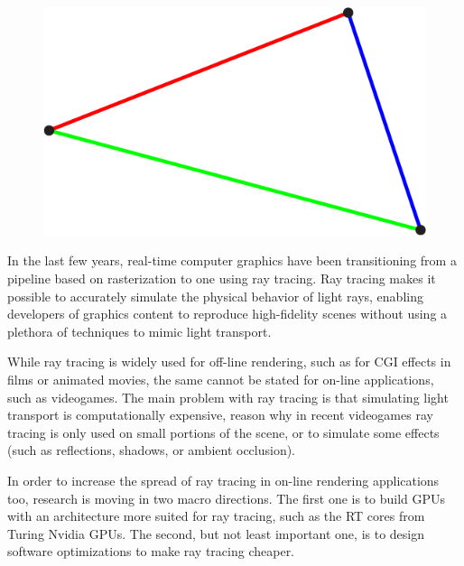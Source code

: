\documentclass{PoliMi_MasterThesis}
\newcommand*\triangleLogo{
	\clearpage
	\thispagestyle{empty}
	\newpage
	\begin{figure}
		\centering
		\includegraphics[width=\textwidth]{Images/triangle_logo_thin.png} 
	\end{figure}
}
\begin{document}


\pagestyle{empty} %
\frontmatter %



\startpreamble
\triangleLogo
\setcounter{page}{1} %

\makeatletter
\let\savedchap\@makechapterhead
\def\@makechapterhead{\savedchap}
\let\@makechapterhead\savedchap
\makeatletter


In the last few years, real-time computer graphics have been transitioning from a pipeline based on rasterization to one using ray tracing.
Ray tracing makes it possible to accurately simulate the physical behavior of light rays, enabling developers of graphics content to reproduce high-fidelity scenes without using a plethora of techniques to mimic light transport.

While ray tracing is widely used for off-line rendering, such as for CGI effects in films or animated movies, the same cannot be stated for on-line applications, such as videogames. The main problem with ray tracing is that simulating light transport is computationally expensive, reason why in recent videogames ray tracing is only used on small portions of the scene, or to simulate some effects (such as reflections, shadows, or ambient occlusion).

In order to increase the spread of ray tracing in on-line rendering applications too, research is moving in two macro directions. The first one is to build GPUs with an architecture more suited for ray tracing, such as the RT cores from Turing Nvidia GPUs. The second, but not least important one, is to design software optimizations to make ray tracing cheaper.
\end{document}
